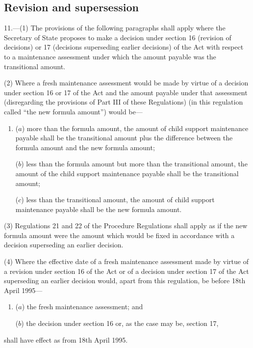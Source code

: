 \documentclass[12pt,a4paper]{article}
\begin{document}
\subsection[11. Revision and supersession]{Revision and supersession}

11.—(1) The provisions of the following paragraphs shall apply where the Secretary of State proposes to make a decision under section 16 (revision of decisions) or 17 (decisions superseding earlier decisions) of the Act with respect to a maintenance assessment under which the amount payable was the transitional amount.

(2) Where a fresh maintenance assessment would be made by virtue of a decision under section 16 or 17 of the Act and the amount payable under that assessment (disregarding the provisions of Part III of these Regulations) (in this regulation called “the new formula amount”) would be—
\begin{enumerate}\item[]
($a$) more than the formula amount, the amount of child support maintenance payable shall be the transitional amount plus the difference between the formula amount and the new formula amount;

($b$) less than the formula amount but more than the transitional amount, the amount of the child support maintenance payable shall be the transitional amount;

($c$) less than the transitional amount, the amount of child support maintenance payable shall be the new formula amount.
\end{enumerate}

(3) Regulations 21 and 22 of the Procedure Regulations shall apply as if the new formula amount were the amount which would be fixed in accordance with a decision superseding an earlier decision.

(4) Where the effective date of a fresh maintenance assessment made by virtue of a revision under section 16 of the Act or of a decision under section 17 of the Act superseding an earlier decision would, apart from this regulation, be before 18th April 1995—
\begin{enumerate}\item[]
($a$) the fresh maintenance assessment; and

($b$) the decision under section 16 or, as the case may be, section 17,
\end{enumerate}
shall have effect as from 18th April 1995.
\end{document}
